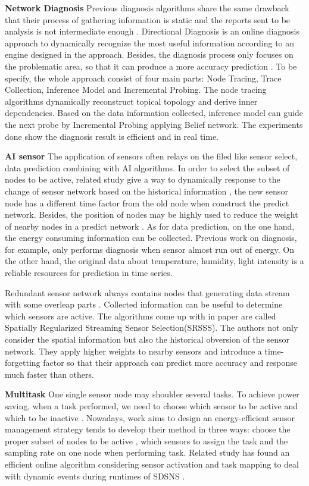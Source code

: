 \textbf{Network Diagnosis}
Previous diagnosis algorithms share the same drawback that their process of gathering information is static and the reports sent to be analysis is not intermediate enough \cite{Ramanathan2005Sympathy,Khan2010Diagnostic}. Directional Diagnosis \cite{gong2015directional} is an online diagnosis approach to dynamically recognize the most useful information according to an engine designed in the approach. Besides, the diagnosis process only focuses on the problematic area, so that it can produce a more accuracy prediction \cite{Pavlou2015How}. To be specify, the whole approach consist of four main parts: Node Tracing, Trace Collection, Inference Model and Incremental Probing. The node tracing algorithms dynamically reconstruct topical topology and derive inner dependencies. Based on the data information collected, inference model can guide the next probe by Incremental Probing applying Belief network. The experiments done show the diagnosis result is efficient and in real time.

\textbf{AI sensor}
The application of sensors often relays on the filed like sensor select, data prediction combining with AI algorithms. In order to select the subset of nodes to be active, related study give a way to dynamically response to the change of sensor network based on the historical information \cite{Mo2013Dynamic}, the new sensor node has a different time factor from the old node when construct the predict network. Besides, the position of nodes may be highly used to reduce the weight of nearby nodes in a predict network \cite{Kumar2017Edge}. As for data prediction, on the one hand, the energy consuming information can be collected. Previous work on diagnosis, for example, only performs diagnosis when sensor almost run out of energy. On the other hand, the original data about temperature, humidity, light intensity is a reliable resources for prediction in time series\cite{Raza2014Practical}. 

Redundant sensor network always contains nodes that generating data stream with some overleap parts \cite{Ali1995Redundant}. Collected information can be useful to determine which sensors are active. The algorithms come up with in paper\cite{li2016spatially} are called Spatially Regularized Streaming Sensor Selection(SRSSS). The authors not only consider the spatial information but also the historical obversion of the sensor network. They apply higher weights to nearby sensors and introduce a time-forgetting factor \cite{Astrom1989Adaptive} so that their approach can predict more accuracy and response much faster than others.
	
\textbf{Multitask}
One single sensor node may shoulder several tasks. To achieve power saving, when a task performed, we need to choose which sensor to be active and which to be inactive \cite{Georges2011Energy}. Nowadays, work aims to design an energy-efficient sensor management strategy tends to develop their method in three ways: choose the proper subset of nodes to be active \cite{Aghdasi2009High}, which sensors to assign the task and the sampling rate on one node when performing task. Related study has found an efficient online algorithm considering sensor activation and task mapping to deal with dynamic events during runtimes of SDSNS \cite{Zeng2015}.
